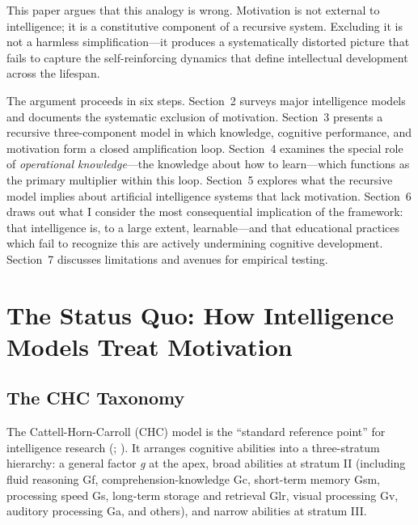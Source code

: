 \documentclass[12pt,a4paper]{article}
\begin{document}
This paper argues that this analogy is wrong. Motivation is not external to intelligence; it is a constitutive component of a recursive system. Excluding it is not a harmless simplification---\hspace{0pt}it produces a systematically distorted picture that fails to capture the self-reinforcing dynamics that define intellectual development across the lifespan.

The argument proceeds in six steps. Section~2 surveys major intelligence models and documents the systematic exclusion of motivation. Section~3 presents a recursive three-component model in which knowledge, cognitive performance, and motivation form a closed amplification loop. Section~4 examines the special role of \emph{operational knowledge}---\hspace{0pt}the knowledge about how to learn---\hspace{0pt}which functions as the primary multiplier within this loop. Section~5 explores what the recursive model implies about artificial intelligence systems that lack motivation. Section~6 draws out what I consider the most consequential implication of the framework: that intelligence is, to a large extent, learnable---\hspace{0pt}and that educational practices which fail to recognize this are actively undermining cognitive development. Section~7 discusses limitations and avenues for empirical testing.


\section{The Status Quo: How Intelligence Models Treat Motivation}

\subsection{The CHC Taxonomy}

The Cattell-Horn-Carroll (CHC) model is the ``standard reference point'' for intelligence research (; \citealp{McGrew2009}). It arranges cognitive abilities into a three-stratum hierarchy: a general factor \emph{g} at the apex, broad abilities at stratum II (including fluid reasoning Gf, comprehension-knowledge Gc, short-term memory Gsm, processing speed Gs, long-term storage and retrieval Glr, visual processing Gv, auditory processing Ga, and others), and narrow abilities at stratum III.
\end{document}
